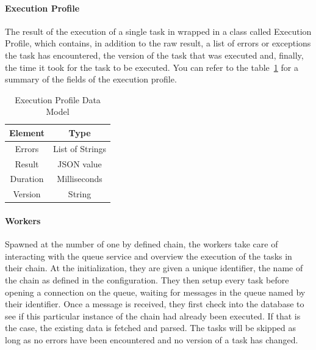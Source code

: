 \paragraph{Execution Profile} %
\label{par:execution_profile}

The result of the execution of a single task in wrapped in a class called Execution Profile, which contains, in addition to the raw result, a list of errors or exceptions the task has encountered, the version of the task that was executed and, finally, the time it took for the task to be executed. You can refer to the table~\ref{tab:execution_profile} for a summary of the fields of the execution profile.

\begin{table}
  \caption{Execution Profile Data Model}
  \label{tab:execution_profile}
  
  \begin{center}
    \begin{tabular}{c | c}
      Element & Type\\
      \hline
      Errors & List of Strings\\
      Result & JSON value\\
      Duration & Milliseconds\\
      Version & String\\
    \end{tabular}
  \end{center}
\end{table}


\paragraph{Workers} %
\label{par:workers}

Spawned at the number of one by defined chain, the workers take care of interacting with the queue service and overview the execution of the tasks in their chain. At the initialization, they are given a unique identifier, the name of the chain as defined in the configuration. They then setup every task before opening a connection on the queue, waiting for messages in the queue named by their identifier. Once a message is received, they first check into the database to see if this particular instance of the chain had already been executed. If that is the case, the existing data is fetched and parsed. The tasks will be skipped as long as no errors have been encountered and no version of a task has changed.

